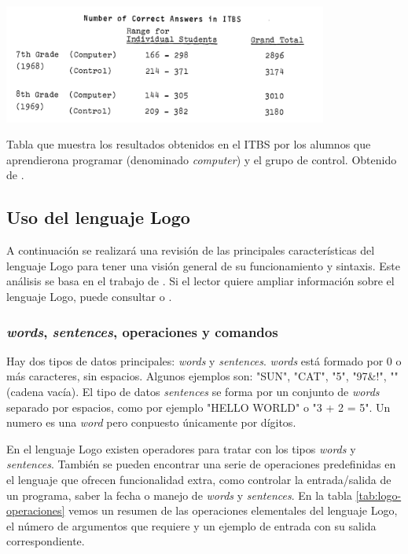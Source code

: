 \begin{table}[!ht]
	\begin{centering}
		\includegraphics[width=0.8\textwidth]{images/logo-itbs.png}
			\caption{Tabla que muestra los resultados obtenidos en el ITBS por los alumnos que aprendierona programar (denominado \emph{computer}) y el grupo de control. Obtenido de \cite[p.251]{feurzeig1969programming}.}
				\label{tab:logo-itbs}
	\end{centering}
\end{table}


\subsection{Uso del lenguaje Logo}
\label{sec:logo-lenguaje}

A continuación se realizará una revisión de las principales características del lenguaje Logo para tener una visión general de su funcionamiento y sintaxis. Este análisis se basa en el trabajo de \cite[p.274-305]{feurzeig1969programming}. Si el lector quiere ampliar información sobre el lenguaje Logo, puede consultar \cite{friendly2014advanced} o \cite{logo-resources}.


\subsubsection*{\emph{words}, \emph{sentences}, operaciones y comandos}

Hay dos tipos de datos principales: \emph{words} y \emph{sentences}. \emph{words} está formado por 0 o más caracteres, sin espacios. Algunos ejemplos son: "SUN", "CAT", "5",  "97&!", "" (cadena vacía). El tipo de datos \emph{sentences} se forma por un conjunto de \emph{words} separado por espacios, como por ejemplo "HELLO WORLD" o "3 + 2 = 5". Un numero es una \emph{word} pero conpuesto únicamente por dígitos.

En el lenguaje Logo existen operadores para tratar con los tipos \emph{words} y \emph{sentences}. También se pueden encontrar una serie de operaciones predefinidas en el lenguaje que ofrecen funcionalidad extra, como controlar la entrada/salida de un programa, saber la fecha o manejo de \emph{words} y \emph{sentences}. En la tabla \ref{tab:logo-operaciones} vemos un resumen de las operaciones elementales del lenguaje Logo, el número de argumentos que requiere y un ejemplo de entrada con su salida correspondiente.


